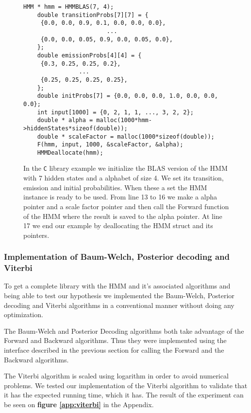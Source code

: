 \begin{figure}[H]
    \centering
    \begin{lstlisting}[style=CStyle]
    HMM * hmm = HMMBLAS(7, 4);
    double transitionProbs[7][7] = {
     {0.0, 0.0, 0.9, 0.1, 0.0, 0.0, 0.0},
                        ...
     {0.0, 0.0, 0.05, 0.9, 0.0, 0.05, 0.0},
    };
    double emissionProbs[4][4] = {
     {0.3, 0.25, 0.25, 0.2},
                ...
     {0.25, 0.25, 0.25, 0.25},
    };
    double initProbs[7] = {0.0, 0.0, 0.0, 1.0, 0.0, 0.0, 0.0};
    int input[1000] = {0, 2, 1, 1, ..., 3, 2, 2};
    double * alpha = malloc(1000*hmm->hiddenStates*sizeof(double));
    double * scaleFactor = malloc(1000*sizeof(double));
    F(hmm, input, 1000, &scaleFactor, &alpha);
    HMMDeallocate(hmm);\end{lstlisting}
    \caption{In the \texttt{C} library example we initialize the BLAS version of the HMM with 7 hidden states and a alphabet of size 4. We set its transition, emission and initial probabilities. When these a set the HMM instance is ready to be used. From line 13 to 16 we make a alpha pointer and a scale factor pointer and then call the Forward function of the HMM where the result is saved to the alpha pointer. At line 17 we end our example by  deallocating the HMM struct and its pointers.}
    \label{fig:c_example}
\end{figure}


\subsubsection{Implementation of Baum-Welch, Posterior decoding and Viterbi}

To get a complete library with the HMM and it's associated algorithms and being able to test our hypothesis we implemented the Baum-Welch, Posterior decoding and Viterbi algorithms in a conventional manner without doing any optimization.

The Baum-Welch and Posterior Decoding algorithms both take advantage of the Forward and Backward algorithms. Thus they were implemented using the interface described in the previous section for calling the Forward and the Backward algorithms.

The Viterbi algorithm is scaled using logarithm in order to avoid numerical problems. We tested our implementation of the Viterbi algorithm to validate that it has the expected running time, which it has. The result of the experiment can be seen on \textbf{figure \ref{app:viterbi}} in the Appendix. 


